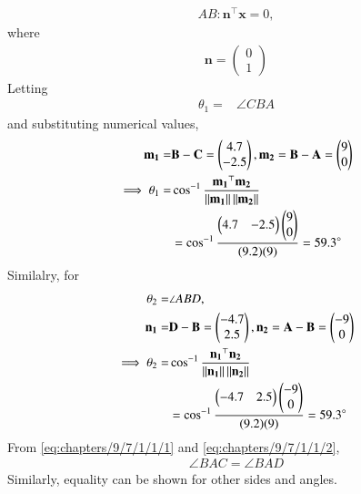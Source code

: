 \documentclass{article}
\providecommand{\norm}[1]{\left\lVert#1\right\rVert}
\newcommand{\myvec}[1]{\ensuremath{\begin{pmatrix}#1\end{pmatrix}}}
\let\vec\mathbf
\begin{document}
\begin{align}
	AB:	\vec{n}^{\top}\vec{x} = 0,
\end{align}
where
\begin{align}
\vec{n} = \myvec{0\\1}
\end{align}
Letting
		\begin{align}
\theta_1=&\angle CBA 
		\end{align}
		and substituting numerical values,
		\begin{align}
\vec{m_1}=&\vec{B}-\vec{C}=\myvec{4.7\\-2.5}, \vec{m_2}=\vec{B}-\vec{A}=\myvec{9\\0}\\
\implies \theta_1=&\cos^{-1}\frac{\vec{m_1}^\top\vec{m_2}}{\norm{\vec{m_1}}\norm{\vec{m_2}}}\\
&=\cos^{-1}\frac{\myvec{4.7&-2.5}\myvec{9\\0}}{(9.2)(9)}=59.3\degree
\label{eq:chapters/9/7/1/1/1}
		\end{align}
		Similalry,  for
		\begin{align}
\theta_2=&\angle ABD, \\
\vec{n_1}=&\vec{D}-\vec{B}=\myvec{-4.7\\2.5}, \vec{n_2}=\vec{A}-\vec{B}=\myvec{-9\\0}\\
\implies \theta_2 =& \cos^{-1}\frac{\vec{n_1}^\top\vec{n_2}}{\norm{\vec{n_1}}\norm{\vec{n_2}}}\\
&=\cos^{-1}\frac{\myvec{-4.7&2.5}\myvec{-9\\0}}{(9.2)(9)}=59.3\degree
\label{eq:chapters/9/7/1/1/2}\\
\end{align}
From \eqref{eq:chapters/9/7/1/1/1} and \eqref{eq:chapters/9/7/1/1/2},
\begin{align}
\angle BAC = \angle BAD 
\end{align}
Similarly, equality can be shown for other sides and angles.
\end{document}
